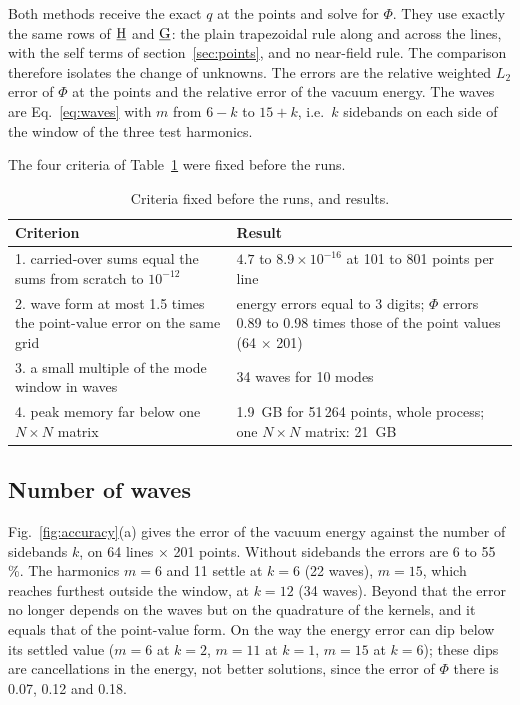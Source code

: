 \documentclass[%
 aip,
 rsi,%
 amsmath,amssymb,
 reprint,%
]{revtex4-1}
\begin{document}
Both methods receive the exact $q$ at the points and solve for $\Phi$.
They use exactly the same rows of $\underline{\mathrm{H}}$ and $\underline{\mathrm{G}}$: the plain trapezoidal rule along and across the lines, with the self terms of section~\ref{sec:points}, and no near-field rule.
The comparison therefore isolates the change of unknowns.
The errors are the relative weighted $L_2$ error of $\Phi$ at the points and the relative error of the vacuum energy.
The waves are Eq.~\eqref{eq:waves} with $m$ from $6-k$ to $15+k$, i.e.\ $k$ sidebands on each side of the window of the three test harmonics.

The four criteria of Table~\ref{tab:criteria} were fixed before the runs.

\begin{table}[b]
\caption{Criteria fixed before the runs, and results.}
\label{tab:criteria}
\begin{ruledtabular}
\begin{tabular}{p{}p{}}
Criterion & Result \\
\hline
1. carried-over sums equal the sums from scratch to $10^{-12}$ & $4.7$ to $8.9\times10^{-16}$ at 101 to 801 points per line \\
2. wave form at most 1.5 times the point-value error on the same grid & energy errors equal to 3 digits; $\Phi$ errors 0.89 to 0.98 times those of the point values (64 $\times$ 201) \\
3. a small multiple of the mode window in waves & 34 waves for 10 modes \\
4. peak memory far below one $N\times N$ matrix & 1.9~GB for 51\,264 points, whole process; one $N\times N$ matrix: 21~GB \\
\end{tabular}
\end{ruledtabular}
\end{table}

\subsection{Number of waves}
Fig.~\ref{fig:accuracy}(a) gives the error of the vacuum energy against the number of sidebands $k$, on 64 lines $\times$ 201 points.
Without sidebands the errors are 6 to 55\,\%.
The harmonics $m = 6$ and 11 settle at $k = 6$ (22 waves), $m = 15$, which reaches furthest outside the window, at $k = 12$ (34 waves).
Beyond that the error no longer depends on the waves but on the quadrature of the kernels, and it equals that of the point-value form.
On the way the energy error can dip below its settled value ($m = 6$ at $k = 2$, $m = 11$ at $k = 1$, $m = 15$ at $k = 6$); these dips are cancellations in the energy, not better solutions, since the error of $\Phi$ there is 0.07, 0.12 and 0.18.
\end{document}
